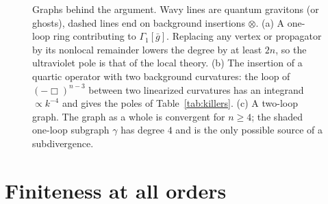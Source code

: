 \documentclass[aps,prd,10pt,twocolumn,superscriptaddress,nofootinbib,floatfix,longbibliography]{revtex4-2}
\begin{document}
\begin{figure}[t]
\caption{Graphs behind the argument. Wavy lines are quantum gravitons (or ghosts), dashed lines end on background insertions $\otimes$. (a) A one-loop ring contributing to $\Gamma_1[\bar g]$. Replacing any vertex or propagator by its nonlocal remainder lowers the degree by at least $2n$, so the ultraviolet pole is that of the local theory. (b) The insertion of a quartic operator with two background curvatures: the loop of $(-\Box)^{n-3}$ between two linearized curvatures has an integrand $\propto k^{-4}$ and gives the poles of Table~\ref{tab:killers}. (c) A two-loop graph. The graph as a whole is convergent for $n\ge4$; the shaded one-loop subgraph $\gamma$ has degree $4$ and is the only possible source of a subdivergence.}
\label{fig:diagrams}
\end{figure}

\section{Finiteness at all orders}
\label{sec:finite}
\end{document}

